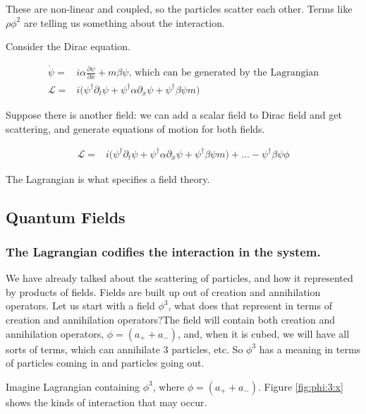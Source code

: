 \documentclass[]{article}
\begin{document}
These are non-linear and coupled, so the particles scatter each other. Terms like $\rho \phi^2$ are telling us something about the interaction.

Consider the Dirac equation.

\begin{align*}
	\dot{\psi} =& i \alpha \frac{\partial \psi}{\partial x} + m \beta \psi \text{, which can be generated by the Lagrangian}\\
	\mathcal{L} =& i \big( \psi^\dagger \partial_t \psi +  \psi^\dagger \alpha \partial_x \psi + \psi^\dagger \beta \psi m \big)
\end{align*}

Suppose there is another field: we can add a scalar field to Dirac field and get scattering, and generate equations of motion for both fields.

\begin{align*}
	\mathcal{L} =& i \big( \psi^\dagger \partial_t \psi +  \psi^\dagger \alpha \partial_x \psi + \psi^\dagger \beta \psi m \big) +...- \psi^\dagger \beta \psi \phi
\end{align*}

The Lagrangian is what specifies a field theory.

\subsection{Quantum Fields}

\subsubsection{The Lagrangian codifies the interaction in the system.}

We have already talked about the scattering of particles, and how it represented by products of fields. Fields are built up out of creation and annihilation operators. Let us start with a field  $\phi^3$, what does that represent in terms of creation and annihilation operators?The field will contain both creation and annihilation operators, $\phi = (a_+ + a_-)$, and, when it is cubed, we will have all sorts of terms, which can annihilate 3 particles, etc. So $\phi^3$ has a meaning in terms of particles coming in and particles going out.

Imagine Lagrangian containing $\phi^3$, where $\phi = (a_+ + a_-)$.
Figure \ref{fig:phi:3:x} shows the kinds of interaction that may occur.
 
\end{document}
